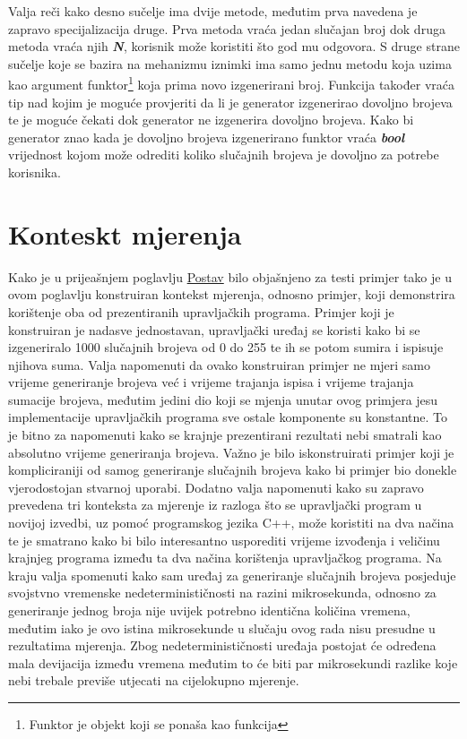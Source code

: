 Valja reči kako desno sučelje ima dvije metode, međutim prva navedena je zapravo specijalizacija druge. Prva metoda vraća jedan slučajan broj dok druga metoda vraća njih \textbf{\textit{N}}, korisnik može koristiti što god mu odgovora. S druge strane sučelje koje se bazira na mehanizmu iznimki ima samo jednu metodu koja uzima kao argument funktor\footnote{Funktor je objekt koji se ponaša kao funkcija} koja prima novo izgenerirani broj. Funkcija također vraća tip nad kojim je moguće provjeriti da li je generator izgenerirao dovoljno brojeva te je moguće čekati dok generator ne izgenerira dovoljno brojeva. Kako bi generator znao kada je dovoljno brojeva izgenerirano funktor vraća \textbf{\textit{bool}} vrijednost kojom može odrediti koliko slučajnih brojeva je dovoljno za potrebe korisnika.

\section{Konteskt mjerenja}
Kako je u prijeašnjem poglavlju \hyperref[section:setup]{Postav} bilo objašnjeno za testi primjer tako je u ovom poglavlju konstruiran kontekst mjerenja, odnosno primjer, koji demonstrira korištenje oba od prezentiranih upravljačkih programa. Primjer koji je konstruiran je nadasve jednostavan, upravljački uređaj se koristi kako bi se izgeneriralo 1000 slučajnih brojeva od 0 do 255 te ih se potom sumira i ispisuje njihova suma. Valja napomenuti da ovako konstruiran primjer ne mjeri samo vrijeme generiranje brojeva već i vrijeme trajanja ispisa i vrijeme trajanja sumacije brojeva, međutim jedini dio koji se mjenja unutar ovog primjera jesu implementacije upravljačkih programa sve ostale komponente su konstantne. To je bitno za napomenuti kako se krajnje prezentirani rezultati nebi smatrali kao absolutno vrijeme generiranja brojeva. Važno je bilo iskonstruirati primjer koji je kompliciraniji od samog generiranje slučajnih brojeva kako bi primjer bio donekle vjerodostojan stvarnoj uporabi. Dodatno valja napomenuti kako su zapravo prevedena tri konteksta za mjerenje iz razloga što se upravljački program u novijoj izvedbi, uz pomoć programskog jezika C++, može koristiti na dva načina te je smatrano kako bi bilo interesantno usporediti vrijeme izvođenja i veličinu krajnjeg programa između ta dva načina korištenja upravljačkog programa. Na kraju valja spomenuti kako sam uređaj za generiranje slučajnih brojeva posjeduje svojstvno vremenske nedeterminističnosti na razini mikrosekunda, odnosno za generiranje jednog broja nije uvijek potrebno identična količina vremena, međutim iako je ovo istina mikrosekunde u slučaju ovog rada nisu presudne u rezultatima mjerenja. Zbog nedeterminističnosti uređaja postojat će određena mala devijacija između vremena međutim to će biti par mikrosekundi razlike koje nebi trebale previše utjecati na cijelokupno mjerenje.
